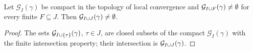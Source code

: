 \begin{lemma}
    \label{lem:sym-fip}
    \leanok

    Let $\mathcal{G}_I(\gamma)$ be compact in the topology of local convergence and
    $\mathcal{G}_{I \cup F}(\gamma) \neq \emptyset$ for every finite $F \subseteq J$. Then
    $\mathcal{G}_{I \cup J}(\gamma) \neq \emptyset$.
\end{lemma}
\begin{proof}
    \leanok

    The sets $\mathcal{G}_{I \cup \left\{ \tau \right\}}(\gamma)$, $\tau \in J$, are closed subsets of the
    compact $\mathcal{G}_I(\gamma)$ with the finite intersection property; their intersection
    is $\mathcal{G}_{I \cup J}(\gamma)$.
\end{proof}


